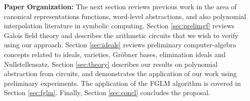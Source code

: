 \begin{enumerate}

\end{enumerate}

{\bf Paper Organization:} The next section reviews previous work in
the area of canonical representations functions, word-level
abstractions, 
and also polynomial interpolation literature in symbolic
computing. Section \ref{sec:prelimgf} reviews 
Galois field theory and describes the arithmetic circuits that we wish
to verify using our approach. Section \ref{sec:ideals}
reviews preliminary computer-algebra concepts related to ideals,
varieties, Gr\"obner bases, elimination ideals and
Nullstellensatz. Section \ref{sec:theory} describes our results on
polynomial abstraction from circuits, and demonstrates the application
of our work using preliminary experiments. The application of the FGLM
algorithm is covered in Section \ref{sec:fglm}. Finally, Section
\ref{sec:concl} concludes the proposal. 
